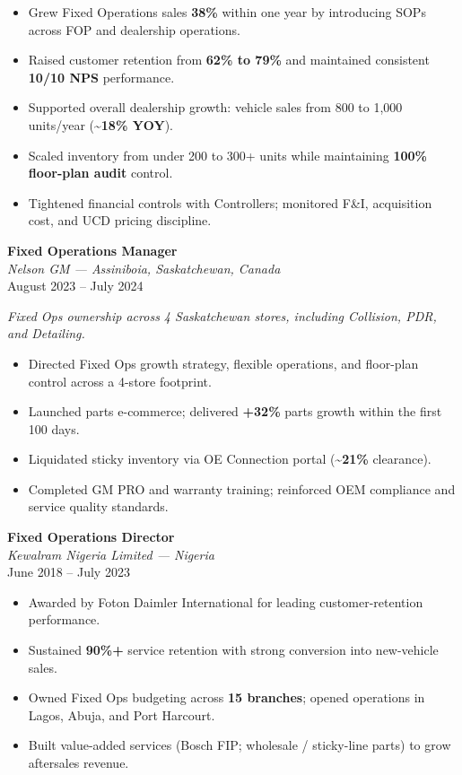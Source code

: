 \documentclass[11pt,letterpaper]{article}
\newcommand{\role}[3]{%
  \textbf{\color{accent}#1}\\[-0.1em]
  \textit{#2}\\[-0.15em]
  {#3}\par\vspace{0.25em}
}
\begin{document}
\begin{itemize}
  \item Grew Fixed Operations sales \textbf{38\%} within one year by introducing SOPs across FOP and dealership operations.
  \item Raised customer retention from \textbf{62\% to 79\%} and maintained consistent \textbf{10/10 NPS} performance.
  \item Supported overall dealership growth: vehicle sales from 800 to 1{,}000 units/year (\textbf{\textasciitilde18\% YOY}).
  \item Scaled inventory from under 200 to 300+ units while maintaining \textbf{100\% floor-plan audit} control.
  \item Tightened financial controls with Controllers; monitored F\&I, acquisition cost, and UCD pricing discipline.
\end{itemize}

\vspace{0.4em}
\role
  {Fixed Operations Manager}
  {Nelson GM --- Assiniboia, Saskatchewan, Canada}
  {August 2023 -- July 2024}

\textit{Fixed Ops ownership across 4 Saskatchewan stores, including Collision, PDR, and Detailing.}
\begin{itemize}
  \item Directed Fixed Ops growth strategy, flexible operations, and floor-plan control across a 4-store footprint.
  \item Launched parts e-commerce; delivered \textbf{+32\%} parts growth within the first 100 days.
  \item Liquidated sticky inventory via OE Connection portal (\textbf{\textasciitilde21\%} clearance).
  \item Completed GM PRO and warranty training; reinforced OEM compliance and service quality standards.
\end{itemize}

\vspace{0.4em}
\role
  {Fixed Operations Director}
  {Kewalram Nigeria Limited --- Nigeria}
  {June 2018 -- July 2023}

\begin{itemize}
  \item Awarded by Foton Daimler International for leading customer-retention performance.
  \item Sustained \textbf{90\%+} service retention with strong conversion into new-vehicle sales.
  \item Owned Fixed Ops budgeting across \textbf{15 branches}; opened operations in Lagos, Abuja, and Port Harcourt.
  \item Built value-added services (Bosch FIP; wholesale / sticky-line parts) to grow aftersales revenue.
\end{itemize}
\end{document}
